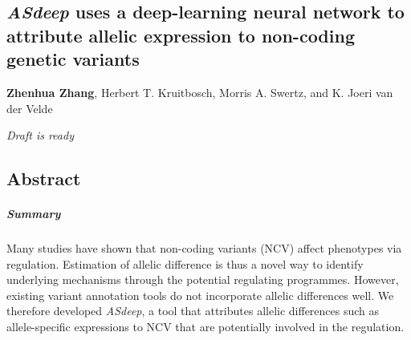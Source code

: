 \documentclass{book}
\begin{document}
\renewcommand{\thetable}{\textbf{Table \arabic{chapter}.\arabic{table}}}
\renewcommand{\thefigure}{\textbf{Figure \arabic{chapter}.\arabic{figure}}}

\begin{refsection} %

%

\chapter{\textit{ASdeep} uses a deep-learning neural network to attribute allelic expression to non-coding genetic variants}
\textbf{Zhenhua Zhang}, Herbert T. Kruitbosch, Morris A. Swertz, and K. Joeri van der Velde
\vfill
\begin{flushright}
\textit{Draft is ready}
\end{flushright}

\newpage

\section*{Abstract}
\paragraph*{Summary}
  Many studies have shown that non-coding variants (NCV) affect phenotypes via regulation.
  Estimation of allelic difference is thus a novel way to identify underlying mechanisms through the potential regulating programmes.
  However, existing variant annotation tools do not incorporate allelic differences well.
  We therefore developed \textit{ASdeep}, a tool that attributes allelic differences such as allele-specific expressions to NCV that are potentially involved in the regulation.


\end{refsection}
\end{document}
